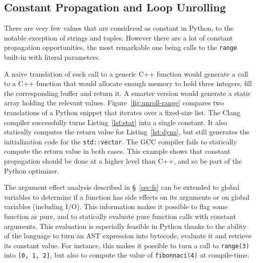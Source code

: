 \documentclass[10pt, preprint]{sigplanconf}
\begin{document}

\subsection{Constant Propagation and Loop Unrolling}

There are very few values that are considered as constant in Python, to the
notable exception of strings and tuples. However there are a lot of constant
propagation opportunities, the most remarkable one being calls to the
\texttt{range} built-in with literal parameters.

A naive translation of such call to a generic C++ function would generate a
call to a C++ function that would allocate enough memory to hold three integers,
fill the corresponding buffer and return it. A smarter version would generate a
static array holding the relevant values. Figure~\ref{fig:unroll-range}
compares two translations of a Python snippet that iterates over a fixed-size
list. The Clang compiler successfully turns Listing~\ref{lst:stat} into a
single constant. It also statically computes the return value for
Listing~\ref{lst:dyna}, but still generates the initialization code for the
\texttt{std::vector}. The GCC compiler fails to statically compute the return
value in both cases. This example shows that constant propagation should be
done at a higher level than C++, and so be part of the Python optimizer.

The argument effect analysis described in \S~\ref{sec:fs} can be extended to
global variables to determine if a function has side effects on its arguments or
on global variables (including I/O). This information makes it possible to flag
some function as pure, and to statically evaluate pure function calls with
constant arguments. This evaluation is especially feasible in Python thanks to
the ability of the language to turn an AST expression into bytecode, evaluate it
and retrieve its constant value. For instance, this makes it possible to turn a
call to \texttt{range(3)} into \texttt{[0, 1, 2]}, but also to compute the
value of \texttt{fibonnaci(4)} at compile-time.
\end{document}
